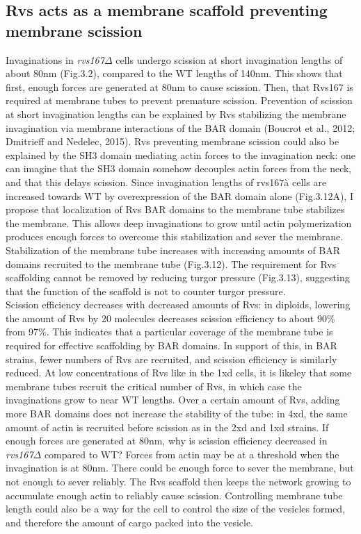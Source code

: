 \documentclass[9pt,lineno]{elife}
\begin{document}
\subsection{Rvs acts as a membrane scaffold preventing membrane scission}
Invaginations in \textit{rvs167$\Delta$} cells undergo scission at short invagination lengths of about 80nm (Fig.3.2), compared to the WT lengths of 140nm. This shows that first, enough forces are generated at 80nm to cause scission. Then, that Rvs167 is required at membrane tubes to prevent premature scission. Prevention of scission at short invagination lengths can be explained by Rvs stabilizing the membrane invagination via membrane interactions of the BAR domain (Boucrot et al., 2012; Dmitrieff and Nedelec, 2015). Rvs preventing membrane scission could also be explained by the SH3 domain mediating actin forces to the invagination neck: one can imagine that the SH3 domain somehow decouples actin forces from the neck, and that this delays scission. Since invagination lengths of rvs167à cells are increased towards WT by overexpression of the BAR domain alone (Fig.3.12A), I propose that localization of Rvs BAR domains to the membrane tube stabilizes the membrane. This allows deep invaginations to grow until actin polymerization produces enough forces to overcome this stabilization and sever the membrane. Stabilization of the membrane tube increases with increasing amounts of BAR domains recruited to the membrane tube (Fig.3.12). The requirement for Rvs scaffolding cannot be removed by reducing turgor pressure (Fig.3.13), suggesting that the function of the scaffold is not to counter turgor pressure. 
~\\ 

Scission efficiency decreases with decreased amounts of Rvs: in diploids, lowering the amount of Rvs by 20 molecules decreases scission efficiency to about 90\% from 97\%. This indicates that a particular coverage of the membrane tube is required for effective scaffolding by BAR domains. In support of this, in BAR strains, fewer numbers of Rvs are recruited, and scission efficiency is similarly reduced. At low concentrations of Rvs like in the 1xd cells, it is likeley that some membrane tubes recruit the critical number of Rvs, in which case the invaginations grow to near WT lengths. Over a certain amount of Rvs, adding more BAR domains does not increase the stability of the tube: in 4xd, the same amount of actin is recruited before scission as in the 2xd and 1xd strains.
If enough forces are generated at 80nm, why is scission efficiency decreased in \textit{rvs167$\Delta$} compared to WT? Forces from actin may be at a threshold when the invagination is at 80nm. There could be enough force to sever the membrane, but not enough to sever reliably. The Rvs scaffold then keeps the network growing to accumulate enough actin to reliably cause scission. Controlling membrane tube length could also be a way for the cell to control the size of the vesicles formed, and therefore the amount of cargo packed into the vesicle.
\end{document}
